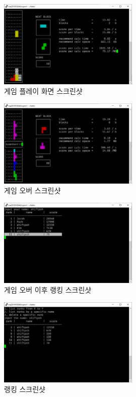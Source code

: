 \begin{figure}
    \centering
        \includegraphics[width=0.6\textwidth]{inc-images/screenshot0}
    \caption{게임 플레이 화면 스크린샷}
    \label{fig:gameplay}
\end{figure}

\begin{figure}
    \centering
        \includegraphics[width=0.6\textwidth]{inc-images/screenshot1}
    \caption{게임 오버 스크린샷}
    \label{fig:gameover}
\end{figure}

\begin{figure}
    \centering
        \includegraphics[width=0.6\textwidth]{inc-images/screenshot2}
    \caption{게임 오버 이후 랭킹 스크린샷}
    \label{fig:endgame-results}
\end{figure}

\begin{figure}
    \centering
        \includegraphics[width=0.6\textwidth]{inc-images/screenshot3}
    \caption{랭킹 스크린샷}
    \label{fig:rankings}
\end{figure}

